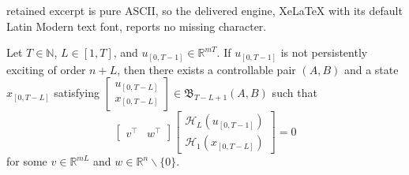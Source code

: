 \documentclass[10pt,a4paper]{amsart}
\begin{document}
retained excerpt is pure ASCII, so the delivered engine, XeLaTeX with its default Latin Modern text font, reports no missing character.
\begin{lemma}
\label{lem:henk}
Let $T\in\mathbb{N}$, $L\in[1,T]$, and $u_{[0,T-1]}\in\mathbb{R}^{mT}$. If $u_{[0,T-1]}$ is not persistently exciting of order $n+L$, then there exists a controllable pair $(A,B)$ and a state $x_{[0,T-L]}$ satisfying $\begin{bmatrix}
u_{[0,T-L]} \\ x_{[0,T-L]}
\end{bmatrix}\in\mathfrak{B}_{T-L+1}(A,B)$ such that
\begin{equation}
\label{eq:lem:henk-1}
\begin{bmatrix}
v^\top & w^\top
\end{bmatrix}\begin{bmatrix}
\mathcal{H}_L(u_{[0,T-1]}) \\
\mathcal{H}_1(x_{[0,T-L]}) 
\end{bmatrix}=0
\end{equation}
for some $v\in\mathbb{R}^{mL}$ and $w\in\mathbb{R}^n\backslash\{0\}$.
\end{lemma}
\end{document}
